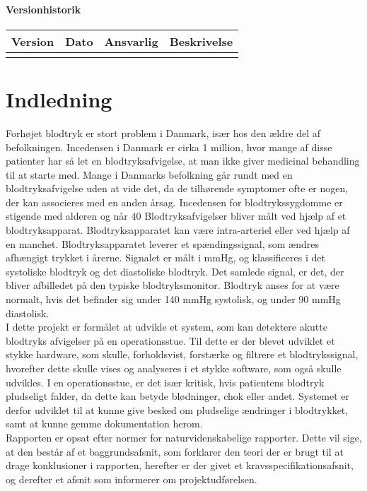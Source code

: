 \subsubsection{Versionhistorik}

\begin{longtabu} to 
    Version &    Dato &    Ansvarlig &    Beskrivelse\\[-1ex]
    \midrule
   
    	
\label{version_Systemark}
\end{longtabu}

\chapter{Indledning}

Forhøjet blodtryk er stort problem i Danmark, især hos den ældre del af befolkningen. Incedensen i Danmark er cirka 1 million, hvor mange af disse patienter har så let en blodtryksafvigelse, at man ikke giver medicinal behandling til at starte med. Mange i Danmarks befolkning går rundt med en blodtryksafvigelse uden at vide det, da de tilhørende symptomer ofte er nogen, der kan associeres med en anden årsag. Incedensen for blodtrykssygdomme er stigende med alderen og når 40%
Blodtryksafvigelser bliver målt ved hjælp af et blodtryksapparat. Blodtryksapparatet kan være intra-arteriel eller ved hjælp af en manchet. Blodtryksapparatet leverer et spændingssignal, som ændres afhængigt trykket i årerne. Signalet er målt i mmHg, og klassificeres i det systoliske blodtryk og det diastoliske blodtryk. Det samlede signal, er det, der bliver afbilledet på den typiske blodtryksmonitor. Blodtryk anses for at være normalt, hvis det befinder sig under 140 mmHg systolisk, og under 90 mmHg diastolisk. \\
I dette projekt er formålet at udvikle et system, som kan detektere akutte blodtryks afvigelser på en operationsstue. Til dette er der blevet udviklet et stykke hardware, som skulle, forholdsvist, forstærke og filtrere et blodtrykssignal, hvorefter dette skulle vises og analyseres i et stykke software, som også skulle udvikles. I en operationsstue, er det især kritisk, hvis patientens blodtryk pludseligt falder, da dette kan betyde blødninger, chok eller andet. Systemet er derfor udviklet til at kunne give besked om pludselige ændringer i blodtrykket, samt at kunne gemme dokumentation herom. \\
Rapporten er opsat efter normer for naturvidenskabelige rapporter. Dette vil sige, at den består af et baggrundsafsnit, som forklarer den teori der er brugt til at drage konklusioner i rapporten, herefter er der givet et kravsspecifikationsafsnit, og derefter et afsnit som informerer om projektudførelsen. \\


  
